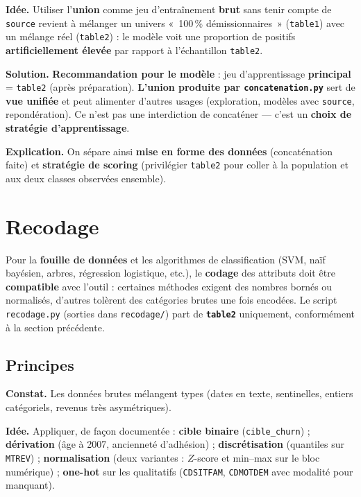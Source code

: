 \documentclass[11pt,a4paper]{article}
\begin{document}
\textbf{Idée.} Utiliser l'\textbf{union} comme jeu d'entraînement \textbf{brut} sans tenir compte de \texttt{source} revient à mélanger un univers «~100\,\% démissionnaires~» (\texttt{table1}) avec un mélange réel (\texttt{table2}) : le modèle voit une proportion de positifs \textbf{artificiellement élevée} par rapport à l'échantillon \texttt{table2}.

\textbf{Solution.} \textbf{Recommandation pour le modèle} : jeu d'apprentissage \textbf{principal} = \texttt{table2} (après préparation). \textbf{L'union produite par \texttt{concatenation.py}} sert de \textbf{vue unifiée} et peut alimenter d'autres usages (exploration, modèles avec \texttt{source}, repondération). Ce n'est pas une interdiction de concaténer --- c'est un \textbf{choix de stratégie d'apprentissage}.

\textbf{Explication.} On sépare ainsi \textbf{mise en forme des données} (concaténation faite) et \textbf{stratégie de scoring} (privilégier \texttt{table2} pour coller à la population et aux deux classes observées ensemble).

\section{Recodage}

Pour la \textbf{fouille de données} et les algorithmes de classification (SVM, naïf bayésien, arbres, régression logistique, etc.), le \textbf{codage} des attributs doit être \textbf{compatible} avec l'outil : certaines méthodes exigent des nombres bornés ou normalisés, d'autres tolèrent des catégories brutes une fois encodées. Le script \texttt{recodage.py} (sorties dans \texttt{recodage/}) part de \textbf{\texttt{table2}} uniquement, conformément à la section précédente.

\subsection{Principes}

\textbf{Constat.} Les données brutes mélangent types (dates en texte, sentinelles, entiers catégoriels, revenus très asymétriques).

\textbf{Idée.} Appliquer, de façon documentée : \textbf{cible binaire} (\texttt{cible\_churn}) ; \textbf{dérivation} (âge à 2007, ancienneté d'adhésion) ; \textbf{discrétisation} (quantiles sur \texttt{MTREV}) ; \textbf{normalisation} (deux variantes : $Z$-score et min--max sur le bloc numérique) ; \textbf{one-hot} sur les qualitatifs (\texttt{CDSITFAM}, \texttt{CDMOTDEM} avec modalité pour manquant).
\end{document}
